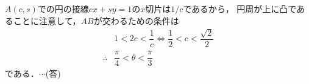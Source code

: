 \documentclass[../../main.tex]{subfiles}
\begin{document}
$A(c,s)$での円の接線$cx+sy=1$の$x$切片は$1/c$であるから，
円周が上に凸であることに注意して，$AB$が交わるための条件は
\begin{align}
  & 1<2c<\dfrac{1}{c}\Longleftrightarrow \dfrac{1}{2}<c<\dfrac{\sqrt{2}}{2} \\
  \therefore
  & \dfrac{\pi}{4}<\theta<\dfrac{\pi}{3}
\end{align}
である．$\cdots$(答)
\newpage
\end{document}
